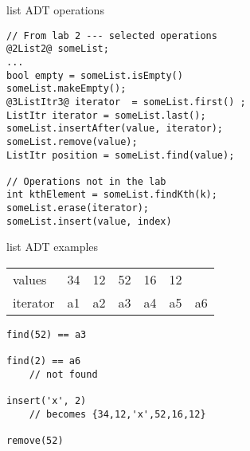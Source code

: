 \begin{frame}[fragile,label=listAdt]{list ADT operations}
\begin{lstlisting}
// From lab 2 --- selected operations
@2List2@ someList;
...
bool empty = someList.isEmpty()
someList.makeEmpty();
@3ListItr3@ iterator  = someList.first() ;
ListItr iterator = someList.last();
someList.insertAfter(value, iterator);
someList.remove(value);
ListItr position = someList.find(value);

// Operations not in the lab
int kthElement = someList.findKth(k);
someList.erase(iterator);
someList.insert(value, index)
\end{lstlisting}
\end{frame}

\begin{frame}[fragile,label=listAdtExample]{list ADT examples}
\begin{tabular}{l|llllll}
values & 34 & 12 & 52 & 16 & 12 \\
iterator & a1 & a2 & a3 & a4 & a5 & a6 \\
\end{tabular}
\begin{lstlisting}
find(52) == a3

find(2) == a6
    // not found

insert('x', 2) 
    // becomes {34,12,'x',52,16,12}

remove(52)
\end{lstlisting}
\end{frame}

